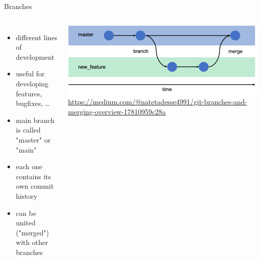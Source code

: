 \documentclass[10pt, graphics, aspectratio=169, table]{beamer}
\begin{document}
    \begin{frame}{Branches}
        \begin{columns}
                \begin{itemize}
                    \item different lines of development
                    \item useful for developing features, bugfixes, \ldots
                    \item main branch is called "master" or "main"
                    \item each one contains its own commit history
                    \item can be united ("merged") with other branches
                \end{itemize}
                \center\includegraphics[scale=0.25]{img/branches.png}
                \center\tiny\url{https://medium.com/@natetadesse4991/git-branches-and-merging-overview-17810959c28a}
        \end{columns}
    \end{frame}
\end{document}
